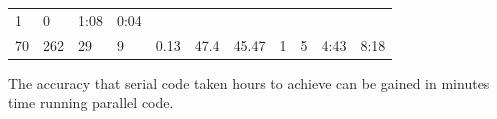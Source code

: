 \documentclass[]{article}
\begin{document}
\begin{longtable}[c]{@{}lllllllllll@{}}
\begin{minipage}[t]{0.07\columnwidth}\raggedright\strut
1
\strut\end{minipage} &
\begin{minipage}[t]{0.07\columnwidth}\raggedright\strut
0
\strut\end{minipage} &
\begin{minipage}[t]{0.07\columnwidth}\raggedright\strut
1:08
\strut\end{minipage} &
\begin{minipage}[t]{0.07\columnwidth}\raggedright\strut
0:04
\strut\end{minipage}\tabularnewline
\begin{minipage}[t]{0.07\columnwidth}\raggedright\strut
70
\strut\end{minipage} &
\begin{minipage}[t]{0.07\columnwidth}\raggedright\strut
262
\strut\end{minipage} &
\begin{minipage}[t]{0.07\columnwidth}\raggedright\strut
29
\strut\end{minipage} &
\begin{minipage}[t]{0.07\columnwidth}\raggedright\strut
9
\strut\end{minipage} &
\begin{minipage}[t]{0.07\columnwidth}\raggedright\strut
0.13
\strut\end{minipage} &
\begin{minipage}[t]{0.07\columnwidth}\raggedright\strut
47.4
\strut\end{minipage} &
\begin{minipage}[t]{0.07\columnwidth}\raggedright\strut
45.47
\strut\end{minipage} &
\begin{minipage}[t]{0.07\columnwidth}\raggedright\strut
1
\strut\end{minipage} &
\begin{minipage}[t]{0.07\columnwidth}\raggedright\strut
5
\strut\end{minipage} &
\begin{minipage}[t]{0.07\columnwidth}\raggedright\strut
4:43
\strut\end{minipage} &
\begin{minipage}[t]{0.07\columnwidth}\raggedright\strut
8:18
\strut\end{minipage}\tabularnewline
\bottomrule
\end{longtable}

The accuracy that serial code taken hours to achieve can be gained in
minutes time running parallel code.
\end{document}

